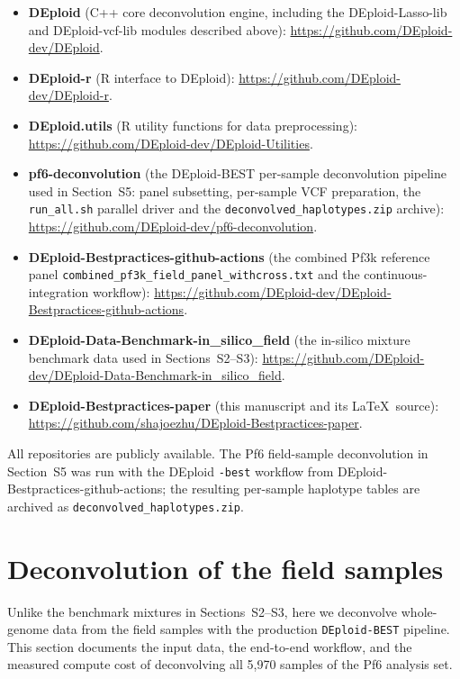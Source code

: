 \documentclass{article}
\renewcommand{\thepage}{S1-\arabic{page}}
\begin{document}
\begin{itemize}
  \item \textbf{DEploid} (C++ core deconvolution engine, including the
    DEploid-Lasso-lib and DEploid-vcf-lib modules described above):
    \url{https://github.com/DEploid-dev/DEploid}.
  \item \textbf{DEploid-r} (R interface to DEploid):
    \url{https://github.com/DEploid-dev/DEploid-r}.
  \item \textbf{DEploid.utils} (R utility functions for data preprocessing):
    \url{https://github.com/DEploid-dev/DEploid-Utilities}.
  \item \textbf{pf6-deconvolution} (the DEploid-BEST per-sample deconvolution
    pipeline used in Section~S5: panel subsetting, per-sample VCF preparation,
    the \texttt{run\_all.sh} parallel driver and the
    \texttt{deconvolved\_haplotypes.zip} archive):
    \url{https://github.com/DEploid-dev/pf6-deconvolution}.
  \item \textbf{DEploid-Bestpractices-github-actions} (the combined Pf3k
    reference panel \texttt{combined\_pf3k\_field\_panel\_withcross.txt} and
    the continuous-integration workflow):
    \url{https://github.com/DEploid-dev/DEploid-Bestpractices-github-actions}.
  \item \textbf{DEploid-Data-Benchmark-in\_silico\_field} (the in-silico
    mixture benchmark data used in Sections~S2--S3):
    \url{https://github.com/DEploid-dev/DEploid-Data-Benchmark-in_silico_field}.
  \item \textbf{DEploid-Bestpractices-paper} (this manuscript and its
    \LaTeX\ source):
    \url{https://github.com/shajoezhu/DEploid-Bestpractices-paper}.
\end{itemize}

\noindent All repositories are publicly available. The Pf6 field-sample
deconvolution in Section~S5 was run with the DEploid \texttt{-best} workflow
from DEploid-Bestpractices-github-actions; the resulting per-sample haplotype
tables are archived as \texttt{deconvolved\_haplotypes.zip}. %

\newpage

\renewcommand{\thepage}{S5--\arabic{page}}

\setcounter{page}{1}
\section{Deconvolution of the field samples}
Unlike the benchmark mixtures in Sections~S2--S3, here we deconvolve
whole-genome data from the field samples with the production
\texttt{DEploid-BEST} pipeline. This section documents the input data, the
end-to-end workflow, and the measured compute cost of deconvolving all
5,970 samples of the Pf6 analysis set.
\end{document}
